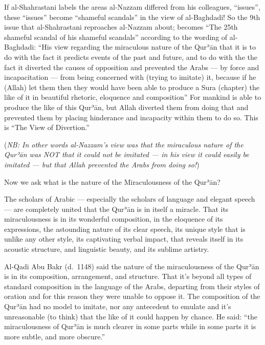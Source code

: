 \documentclass[12pt]{book}
\def \Quran{Qurʾān} %
\def \Qrn{\Quran}   %
\newcommand{\NB}[1]{\emph{\small NB: #1}}
\begin{document}

If al-Shahrastani labels the areas al-Nazzam differed from his colleagues,
“issues”, these “issues” become “shameful scandals” in the view of al-Baghdadi!
So the 9th issue that al-Shahrastani reproaches al-Nazzam about; becomes “The
25th shameful scandal of his shameful scandals” according to the wording of
al-Baghdadi: “His view regarding the miraculous nature of the \Qrn{} that it is
to do with the fact it predicts events of the past and future, and to do with
the the fact it diverted the causes of opposition and prevented the Arabs — by
force and incapacitation — from being concerned with (trying to imitate) it,
because if he (Allah) let them then they would have been able to produce a Sura
(chapter) the like of it in beautiful rhetoric, eloquence and composition” For
mankind is able to produce the like of this \Quran, but Allah diverted them
from doing that and prevented them by placing hinderance and incapacity within
them to do so. This is “The View of Divertion.”\footnotemark

(\NB{In other words al-Nazzam’s view was that the miraculous nature of the
\Qrn{} was NOT that it could not be imitated — in his view it could easily be
imitated — but that Allah prevented the Arabs from doing so!})


Now we ask what is the nature of the Miraculousness of the \Quran?

The scholars of Arabic — especially the scholars of language and elegant speech
— are completely united that the \Qrn{} is in itself a miracle. That its
miraculousness is in its wonderful composition, in the eloquence of its
expressions, the astounding nature of its clear speech, its unique style that
is unlike any other style, its captivating verbal impact, that reveals itself
in its acoustic structure, and linguistic beauty, and its sublime artistry.

Al-Qadi Abu Bakr (d.\ 1148) said the nature of the miraculousness of the \Quran
is in its composition, arrangement, and structure. That it’s beyond all types
of standard composition in the language of the Arabs, departing from their
styles of oration and for this reason they were unable to oppose it. The
composition of the \Qrn{} had no model to imitate, nor any antecedent to
emulate and it’s unreasonable (to think) that the like of it could happen by
chance. He said: “the miraculousness of \Qrn{} is much clearer in some parts
while in some parts it is more subtle, and more obscure.”\footnotemark
\end{document}
